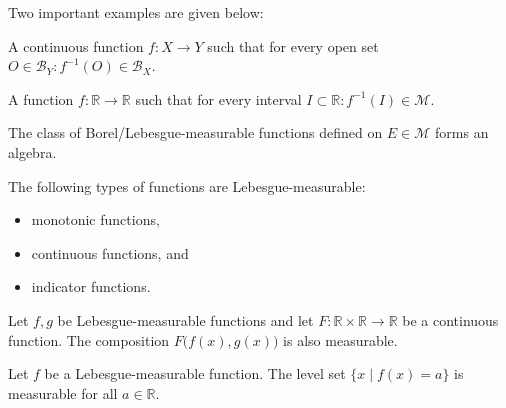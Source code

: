     Two important examples are given below:
    \begin{example}\label{lebesgue:borel_measurable_function}
        A continuous function $f:X\rightarrow Y$ such that for every open set $O\in\mathcal{B}_Y:f^{-1}(O)\in\mathcal{B}_X$.
    \end{example}
    \begin{example}\label{lebesgue:measurable_function}
        A function $f:\mathbb{R}\rightarrow\mathbb{R}$ such that for every interval $I\subset\mathbb{R}:f^{-1}(I)\in\mathcal{M}$.
    \end{example}

    \begin{property}
        The class of Borel/Lebesgue-measurable functions defined on $E\in\mathcal{M}$ forms an algebra.
    \end{property}

    \begin{example}
        The following types of functions are Lebesgue-measurable:
        \begin{itemize}
            \item monotonic functions,
            \item continuous functions, and
            \item indicator functions.
        \end{itemize}
    \end{example}
    \begin{result}
        Let $f,g$ be Lebesgue-measurable functions and let $F:\mathbb{R}\times\mathbb{R}\rightarrow\mathbb{R}$ be a continuous function. The composition $F\big(f(x),g(x)\big)$ is also measurable.
    \end{result}

    \begin{property}
        Let $f$ be a Lebesgue-measurable function. The level set $\{x\mid f(x) = a\}$ is measurable for all $a\in\mathbb{R}$.
    \end{property}

